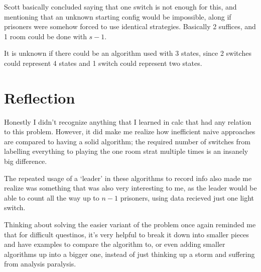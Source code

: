 \documentclass[12pt]{article}
\begin{document}
Scott basically concluded saying that one switch is not enough for this, and mentioning that an unknown starting config would be impossible, along if prisoners were somehow forced to use identical strategies. Basically 2 suffices, and 1 room could be done with \(s - 1\). 

It is unknown if there could be an algorithm used with 3 states, since 2 switches could represent 4 states and 1 switch could represent two states. 

\section{Reflection} 
Honestly I didn't recognize anything that I learned in calc that had any relation to this problem. However, it did make me realize how inefficient naive approaches are compared to having a solid algorithm; the required number of switches from labelling everything to playing the one room strat multiple times is an insanely big difference.

The repeated usage of a `leader' in these algorithms to record info also made me realize was something that was also very interesting to me, as the leader would be able to count all the way up to \(n-1\) prisoners, using data recieved just one light switch. 

Thinking about solving the easier variant of the problem once again reminded me that for difficult questinos, it's very helpful to break it down into smaller pieces and have examples to compare the algorithm to, or even adding smaller algorithms up into a bigger one, instead of just thinking up a storm and suffering from analysis paralysis.
\end{document}

